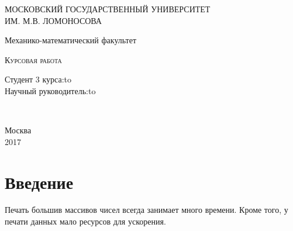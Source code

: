 \documentclass[a4paper, 12pt, twoside]{article}
\begin{document}
\begin{titlepage} \newpage 
\begin{center} МОСКОВСКИЙ ГОСУДАРСТВЕННЫЙ УНИВЕРСИТЕТ\\ ИМ. М.В. ЛОМОНОСОВА\end{center} 
\vspace{8em} \begin{center} 
\Large Механико-математический факультет \\ \end{center}
\vspace{2em} \begin{center} 
\textsc{Курсовая работа \linebreak \textbf{}
\linebreak \linebreak \textbf{}} \end{center}
\vspace{6em} \newbox{\lbox}  
\newlength{\maxl} \setlength{\maxl}{\wd\lbox} \hfill\parbox{12	cm}
{ \hspace*{10cm}\hspace*{-5cm}Студент 3 курса:\hfill\hbox to\\
\hspace*{10cm}\hspace*{-5cm}Научный руководитель:\hfill\hbox to}\\  \vspace{\fill}
\begin{center} Москва \\ 2017\end{center} \end{titlepage}


\tableofcontents

\renewcommand{\figurename}{Рисунок}
\newcommand{\class}{\textcolor[rgb]{0.5,0,0.5}}
\newcommand{\type}{\textcolor[rgb]{0.5,0.5,0}}
\newcommand{\field}{\textcolor[rgb]{0.5,0,0}}

\newpage

\section*{Введение}
Печать большив массивов чисел всегда занимает много времени.
Кроме того, у печати данных мало ресурсов для ускорения.
\end{document}
